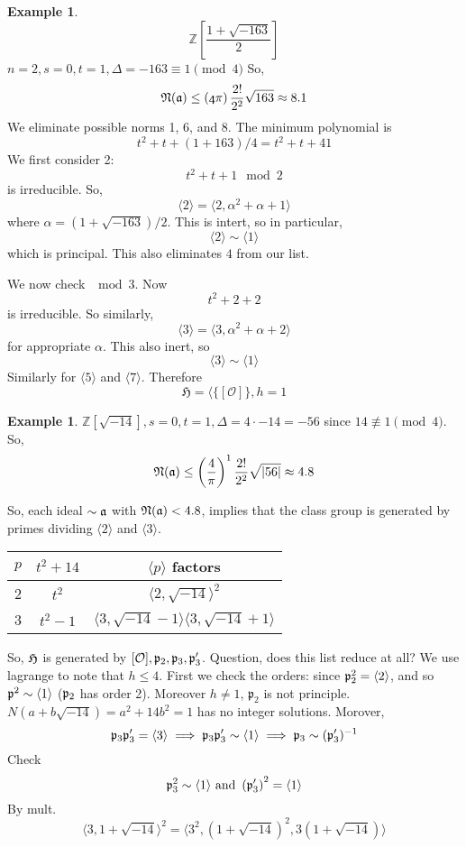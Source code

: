 \documentclass{article}
\theoremstyle{plain}
\theoremstyle{definition}
\newtheorem{exmp}[thm]{Example} %
\begin{document}
\begin{exmp}
\[ \mathbb{Z}[\frac{1+\sqrt{-163}}{2}] \]
$n = 2, s = 0, t = 1, \Delta = -163 \equiv 1 \pmod{4}$
So, 
\[ \mathfrak{N}(\frak{a}) \leq \left( \frak{4}{\pi} \right) \frac{2!}{2^2}
\sqrt{163} \approx 8.1 \]
We eliminate possible norms 1, 6, and 8. The minimum polynomial is 
\[ t^2 + t + (1+163)/4 = t^2 + t + 41 \]
We first consider 2:
\[ t^2 + t + 1 \mod 2 \]
is irreducible. So,
\[ \langle 2 \rangle = \langle 2, \alpha^2 + \alpha+1 \rangle \]
where $\alpha = (1+\sqrt{-163})/2$. This is intert, so in particular,
\[ \langle 2 \rangle \sim \langle 1 \rangle \]
which is principal. This also eliminates $4$ from our list. 

We now check $\mod 3$. Now
\[ t^2 + 2 + 2 \] 
is irreducible. So similarly, 
\[ \langle 3 \rangle = \langle 3 , \alpha^2+\alpha+2 \rangle \]
for appropriate $\alpha$. This also inert, so
\[ \langle 3 \rangle \sim \langle 1 \rangle \]
Similarly for $\langle 5 \rangle$ and $\langle 7 \rangle$.
Therefore
\[ \mathfrak{H} = \langle\{[\mathcal{O}]\}, h = 1 \]


\end{exmp}
\begin{exmp}
$\mathbb{Z}[\sqrt{-14}], s = 0, t = 1, \Delta = 4 \cdot -14 = -56$ since $14
\not\equiv 1 \pmod{4}$. So,
\[ \frak{N}(\frak{a}) \leq \left( \frac{4}{\pi}\right)^1 \frac{2!}{2^2}
\sqrt{|56|} \approx 4.8 \]

So, each ideal $\sim \frak{a}$ with $\frak{N}(\frak{a}) < 4.8$, implies that the
class group is generated by primes dividing $\langle 2 \rangle$ and $\langle 3
\rangle$. \\
\begin{tabular}{ccc}
$p$ & $t^2+14$ & $\langle p \rangle$ factors \\\hline
2 & $t^2$ &  $\langle 2, \sqrt{-14} \rangle^2$ \\
3 & $t^2 -1$ & $\langle 3, \sqrt{-14}-1 \rangle \langle 3, \sqrt{-14}+1 \rangle$
\end{tabular}
\end{exmp}
So, $\frak{H}$ is generated by $[\mathcal{O}], \frak{p}_2, \frak{p}_3,
\frak{p}_3'$. Question, does this list reduce at all? We use lagrange to note
that $h \leq 4$. First we check the orders: since $\frak{p}_2^2 = \langle 2
\rangle $, and so $\frak{p}^2 \sim \langle 1 \rangle$ ($\frak{p}_2$ has order 2).
Moreover $h \neq 1$, $\mathfrak{p}_2$ is not principle. $N(a+b\sqrt{-14}) = a^2
+14b^2 = 1$ has no integer solutions. Morover, 
\[ \frak{p}_3\frak{p}_3' = \langle 3 \rangle \implies \frak{p}_3\frak{p}_3'
\sim \langle 1 \rangle \implies \frak{p}_3 \sim(\frak{p}_3')^{-1} \]
Check
\[ \frak{p}_3^2 \sim \langle 1 \rangle \text{ and } \left(\frak{p}_3'\right)^2 =
\langle 1 \rangle \]
By mult.
\[ \langle 3, 1+\sqrt{-14}\rangle^2 = \langle 3^2, (1+\sqrt{-14})^2,
3(1+\sqrt{-14}) \rangle \]
\end{document}

